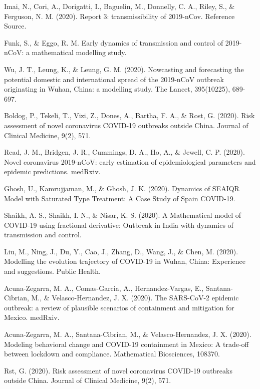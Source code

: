 \begin{thebibliography}{222}
   Imai, N., Cori, A., Dorigatti, I., Baguelin, M., Donnelly, C.
  A., Riley, S., \& Ferguson, N. M. (2020). Report 3: transmissibility of
  2019-nCov. Reference Source.

   Funk, S., \& Eggo, R. M. Early dynamics of transmission
  and control of 2019-nCoV: a mathematical modelling study.

   Wu, J. T., Leung, K., \& Leung, G. M. (2020). Nowcasting and
  forecasting the potential domestic and international spread of the 2019-nCoV
  outbreak originating in Wuhan, China: a modelling study. The Lancet,
  395(10225), 689-697.

   Boldog, P., Tekeli, T., Vizi, Z., Dones, A., Bartha, F. A., \&
  Rost, G. (2020). Risk assessment of novel coronavirus COVID-19 outbreaks
  outside China. Journal of Clinical Medicine, 9(2), 571.

   Read, J. M., Bridgen, J. R., Cummings, D. A., Ho, A., \&
  Jewell, C. P. (2020). Novel coronavirus 2019-nCoV: early estimation of
  epidemiological parameters and epidemic predictions. medRxiv.

   Ghosh, U., Kamrujjaman, M., \& Ghosh, J. K. (2020). Dynamics
  of SEAIQR Model with Saturated Type Treatment: A Case Study of Spain
  COVID-19.

   Shaikh, A. S., Shaikh, I. N., \& Nisar, K. S. (2020). A
  Mathematical model of COVID-19 using fractional derivative: Outbreak in
  India with dynamics of transmission and control.

   Liu, M., Ning, J., Du, Y., Cao, J., Zhang, D., Wang, J., \&
  Chen, M. (2020). Modelling the evolution trajectory of COVID-19 in Wuhan,
  China: Experience and suggestions. Public Health.

   Acuna-Zegarra, M. A., Comas-Garcia, A., Hernandez-Vargas,
  E., Santana-Cibrian, M., \& Velasco-Hernandez, J. X. (2020). The SARS-CoV-2
  epidemic outbreak: a review of plausible scenarios of containment and
  mitigation for Mexico. medRxiv.

   Acuna-Zegarra, M. A., Santana-Cibrian, M., \&
  Velasco-Hernandez, J. X. (2020). Modeling behavioral change and COVID-19
  containment in Mexico: A trade-off between lockdown and compliance.
  Mathematical Biosciences, 108370.
  
  Rst, G. (2020). Risk assessment of novel coronavirus COVID-19 outbreaks
  outside China. Journal of Clinical Medicine, 9(2), 571.


\end{thebibliography}
